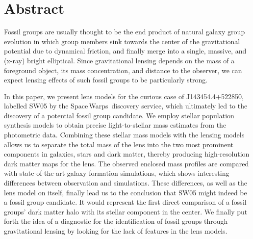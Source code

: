 
\clearpage

\newcommand{\SW}{Space\,Warps\xspace}
\def\pwidth{.99\textwidth}
\def\qwidth{.49\textwidth}
\def\qqwidth{.57\textwidth}

\section*{Abstract}
\noindent Fossil groups are usually thought to be the end product of natural
galaxy group evolution in which group members sink towards the center of the
gravitational potential due to dynamical friction, and finally merge into a
single, massive, and (x-ray) bright elliptical.
Since gravitational lensing depends on the mass of a foreground
object, its mass concentration, and distance to the observer, we can expect
lensing effects of such fossil groups to be particularly strong.

\noindent In this paper, we present lens models for the curious case of
J143454.4$+$522850, labelled SW05 by the \SW~discovery service, which
ultimately led to the discovery of a potential fossil group candidate.
We employ stellar population synthesis models to obtain precise
light-to-stellar mass estimates from the photometric data.
Combining these stellar mass models with the lensing models allows us to
separate the total mass of the lens into the two most prominent components in
galaxies, stars and dark matter, thereby producing high-resolution dark matter
maps for the lens.
The observed enclosed mass profiles are compared with state-of-the-art galaxy
formation simulations, which shows interesting differences between observation
and simulations.
These differences, as well as the lens model on itself, finally lead us to the
conclusion that SW05 might indeed be a fossil group candidate.
It would represent the first direct comparison of a fossil groups' dark matter
halo with its stellar component in the center.
We finally put forth the idea of a diagnostic for the identification of fossil
groups through gravitational lensing by looking for the lack of features in the
lens models.
%

\clearpage
  

  

  

  

  


